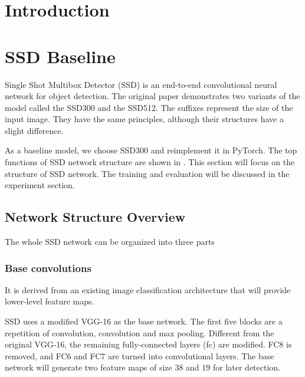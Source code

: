 \documentclass[journal,conference]{IEEEtran}
\begin{document}
\IEEEpeerreviewmaketitle



\section{Introduction}


\section{SSD Baseline}
Single Shot Multibox Detector (SSD) is an end-to-end convolutional neural network for object detection. The original paper \cite{ssd} demonstrates two variants of the model called the SSD300 and the SSD512. The suffixes represent the size of the input image. They have the same principles, although their structures have a slight difference.

As a baseline model, we choose SSD300 and reimplement it in PyTorch. The top functions of SSD network structure are shown in . This section will focus on the structure of SSD network. The training and evaluation will be discussed in the experiment section.


\subsection{Network Structure Overview}
The whole SSD network can be organized into three parts

\subsubsection{Base convolutions}
It is derived from an existing image classification architecture that will provide lower-level feature maps.

SSD uses a modified VGG-16 as the base network. The first five blocks are a repetition of convolution, convolution and max pooling. Different from the original VGG-16, the remaining fully-connected layers (fc) are modified. FC8 is removed, and FC6 and FC7 are turned into convolutional layers. The base network will generate two feature maps of size $38$ and $19$ for later detection.
\end{document}
